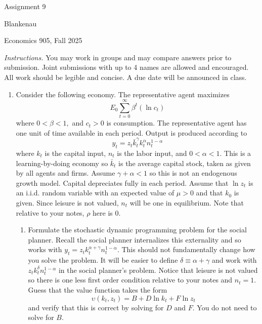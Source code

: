 \documentclass[11pt]{article}
\begin{document}
\begin{center}
{\LARGE Assignment 9}
\end{center}

\noindent Blankenau

\noindent Economics 905, Fall 2025

\noindent \noindent \textit{Instructions.} You may work in groups and may
compare answers prior to submission. Joint submissions with up to 4 names
are allowed and encouraged. All work should be legible and concise. A due
date will be announced in class.

\begin{enumerate}
\item Consider the following economy. The representative agent maximizes%
\begin{equation*}
E_{0}\overset{\infty }{\underset{t=0}{\sum }}\beta ^{t}\left( \ln
c_{t}\right)
\end{equation*}%
where $0<\beta <1,$ and $c_{t}>0$ is consumption. The representative agent
has one unit of time available in each period. Output is produced according
to 
\begin{equation*}
y_{t}=z_{t}\bar{k}_{t}^{\gamma }k_{t}^{\alpha }n_{t}^{1-\alpha }
\end{equation*}%
where $k_{t}$ is the capital input, $n_{t}$ is the labor input, and $%
0<\alpha <1.$ This is a learning-by-doing economy so $\bar{k}_{t}$ is the
average capital stock, taken as given by all agents and firms. Assume $%
\gamma +\alpha <1$ so this is not an endogenous growth model. Capital
depreciates fully in each period. Assume that $\ln z_{t}$ is an i.i.d.
random variable with an expected value of $\mu >0$ and that $k_{0}$ is
given. Since leisure is not valued, $n_{t}$ will be one in equilibrium. Note
that relative to your notes, $\rho $ here is 0.

\begin{enumerate}
\item Formulate the stochastic dynamic programming problem for the social
planner. Recall the social planner internalizes this externality and so
works with $y_{t}=z_{t}k_{t}^{\alpha +\gamma }n_{t}^{1-\alpha }.$ This
should not fundamentally change how you solve the problem. It will be easier
to define $\delta \equiv \alpha +\gamma $ and work with $z_{t}k_{t}^{\delta
}n_{t}^{1-\alpha }$ in the social planner's problem. Notice that leisure is
not valued so there is one less first order condition relative to your notes
and $n_{t}=1.$ Guess that the value function takes the form%
\begin{equation*}
\upsilon \left( k_{t},z_{t}\right) =B+D\ln k_{t}+F\ln z_{t}
\end{equation*}%
and verify that this is correct by solving for $D$ and $F$. You do not need
to solve for $B$.


\end{enumerate}
\end{enumerate}
\end{document}
